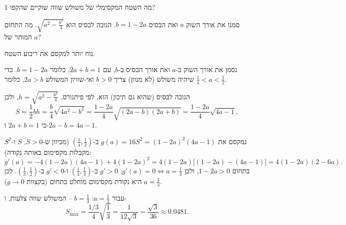 
\begin{question}
מה השטח המקסימלי של משולש שווה שוקיים שהקפו 1?
\end{question}

\begin{hint}
סמנו את אורך השוק $a$ ואת הבסיס $b=1-2a$. הגובה לבסיס הוא $\sqrt{a^2-\frac{b^2}{4}}$. מה התחום המותר של $a$?
\end{hint}

\begin{hint}
נוח יותר למקסם את ריבוע השטח.
\end{hint}

\begin{solution}
נסמן את אורך השוק ב-$a$ ואת אורך הבסיס ב-$b$, עם $2a+b=1$, כלומר $b=1-2a$. כדי שיהיה משולש (לא מנוון) צריך $b>0$ ואי-שוויון המשולש $2a>b$, כלומר $\frac14<a<\frac12$.

הגובה לבסיס (שהוא גם תיכון) הוא, לפי פיתגורס, $h=\sqrt{a^2-\frac{b^2}{4}}$, ולכן
\[ S=\frac12bh=\frac b4\sqrt{4a^2-b^2}=\frac{1-2a}{4}\sqrt{(2a-b)(2a+b)}=\frac{1-2a}{4}\sqrt{4a-1}, \]
כי $2a+b=1$ ו-$2a-b=4a-1$.

נמקסם את $g(a)=16S^2=(1-2a)^2(4a-1)$ ב-$(\frac14,\frac12)$ (מכיוון ש-$S>0$, $S$ ו-$S^2$ מקבלות מקסימום באותה נקודה):
\[ g'(a)=-4(1-2a)(4a-1)+4(1-2a)^2=4(1-2a)\big[(1-2a)-(4a-1)\big]=4(1-2a)(2-6a). \]
בתחום $1-2a>0$, ולכן $g'(a)=0\iff a=\frac13$; $g'>0$ ב-$(\frac14,\frac13)$ ו-$g'<0$ ב-$(\frac13,\frac12)$. לכן $a=\frac13$ היא נקודת מקסימום מוחלט בתחום (בקצוות $g\to0$).

עבור $a=\frac13$: $b=\frac13$ -- המשולש שווה צלעות, ו-
\[ S_{\max}=\frac{1/3}{4}\sqrt{\frac13}=\frac{1}{12\sqrt3}=\boxed{\frac{\sqrt3}{36}}\approx0.0481. \]
\end{solution}
